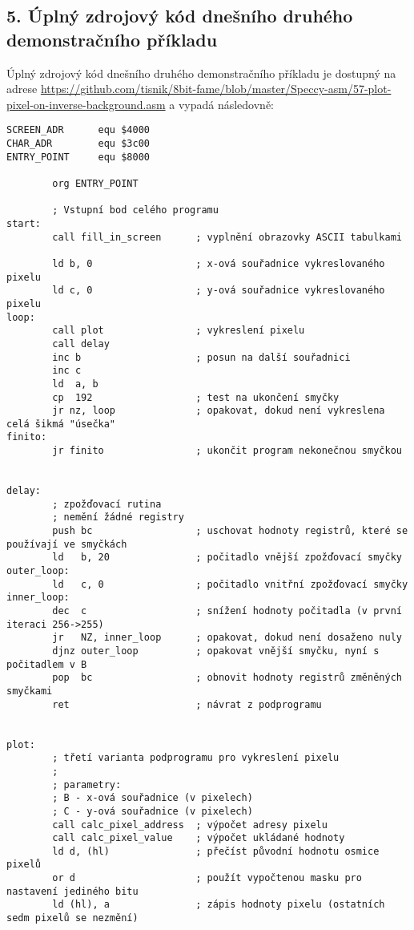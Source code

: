 \documentclass{article}
\begin{document}
\hypertarget{k05}{%
\subsection{5. Úplný zdrojový kód dnešního druhého demonstračního
příkladu}\label{k05}}

Úplný zdrojový kód dnešního druhého demonstračního příkladu je dostupný
na adrese
\url{https://github.com/tisnik/8bit-fame/blob/master/Speccy-asm/57-plot-pixel-on-inverse-background.asm}
a vypadá následovně:

\begin{verbatim}
SCREEN_ADR      equ $4000
CHAR_ADR        equ $3c00
ENTRY_POINT     equ $8000
 
        org ENTRY_POINT
 
        ; Vstupní bod celého programu
start:
        call fill_in_screen      ; vyplnění obrazovky ASCII tabulkami
 
        ld b, 0                  ; x-ová souřadnice vykreslovaného pixelu
        ld c, 0                  ; y-ová souřadnice vykreslovaného pixelu
loop:
        call plot                ; vykreslení pixelu
        call delay
        inc b                    ; posun na další souřadnici
        inc c
        ld  a, b
        cp  192                  ; test na ukončení smyčky
        jr nz, loop              ; opakovat, dokud není vykreslena celá šikmá "úsečka"
finito:
        jr finito                ; ukončit program nekonečnou smyčkou
 
 
delay:
        ; zpožďovací rutina
        ; nemění žádné registry
        push bc                  ; uschovat hodnoty registrů, které se používají ve smyčkách
        ld   b, 20               ; počitadlo vnější zpožďovací smyčky
outer_loop:
        ld   c, 0                ; počitadlo vnitřní zpožďovací smyčky
inner_loop:
        dec  c                   ; snížení hodnoty počitadla (v první iteraci 256->255)
        jr   NZ, inner_loop      ; opakovat, dokud není dosaženo nuly
        djnz outer_loop          ; opakovat vnější smyčku, nyní s počitadlem v B
        pop  bc                  ; obnovit hodnoty registrů změněných smyčkami
        ret                      ; návrat z podprogramu
 
 
plot:
        ; třetí varianta podprogramu pro vykreslení pixelu
        ;
        ; parametry:
        ; B - x-ová souřadnice (v pixelech)
        ; C - y-ová souřadnice (v pixelech)
        call calc_pixel_address  ; výpočet adresy pixelu
        call calc_pixel_value    ; výpočet ukládané hodnoty
        ld d, (hl)               ; přečíst původní hodnotu osmice pixelů
        or d                     ; použít vypočtenou masku pro nastavení jediného bitu
        ld (hl), a               ; zápis hodnoty pixelu (ostatních sedm pixelů se nezmění)

\end{verbatim}
\end{document}
